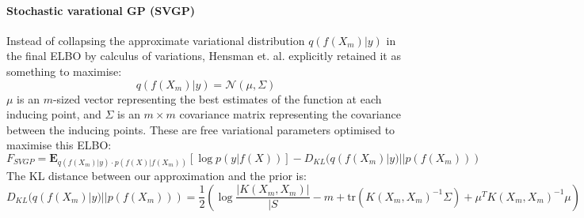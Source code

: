 \paragraph{Stochastic varational GP (SVGP)}
Instead of collapsing the approximate variational distribution $q(f(X_m) | y)$ in the final ELBO by calculus of variations, Hensman et. al. \cite{svgp} explicitly retained it as something to maximise:
\begin{equation} \label{eq:svgp_posterior}
    q(f(X_m) | y) = \mathcal{N}(\mu, \Sigma)
\end{equation}
$\mu$ is an $m$-sized vector representing the best estimates of the function at each inducing point, and $\Sigma$ is an $m \times m$ covariance matrix representing the covariance between the inducing points. These are free variational parameters optimised to maximise this ELBO:
\begin{equation*}
    F_{SVGP} = \textbf{E}_{q(f(X_m) | y) \cdot p(f(X) | f(X_m))} \left[ \log p(y | f(X)) \right] - D_{KL}(q(f(X_m) | y) || p(f(X_m)))
\end{equation*}
The KL distance between our approximation and the prior is:
\begin{equation*}
    D_{KL}(q(f(X_m) | y) || p(f(X_m))) = \frac{1}{2} \left( \log \frac{|K(X_m, X_m)|}{|S} - m + \text{tr}(K(X_m, X_m)^{-1} \Sigma) + \mu^T K(X_m, X_m)^{-1} \mu \right)
\end{equation*}

